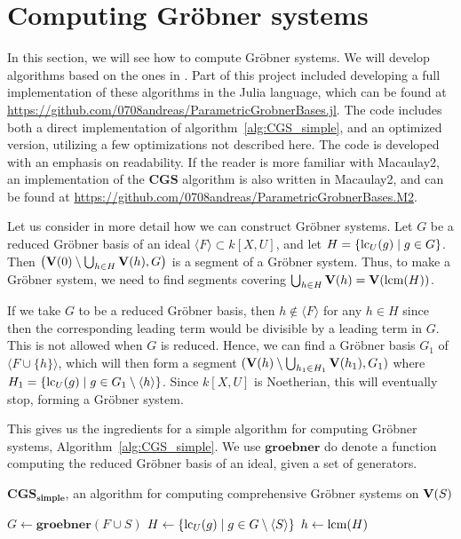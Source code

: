 \section{Computing Gröbner systems}
In this section, we will see how to compute Gröbner systems. We will develop algorithms based on the ones in \cite{ss_algo}. Part of this project included developing a full implementation of these algorithms in the Julia language, which can be found at \url{https://github.com/0708andreas/ParametricGrobnerBases.jl}. The code includes both a direct implementation of algorithm~\ref{alg:CGS_simple}, and an optimized version, utilizing a few optimizations not described here. The code is developed with an emphasis on readability. If the reader is more familiar with Macaulay2, an implementation of the $\mathbf{CGS}$ algorithm is also written in Macaulay2, and can be found at \url{https://github.com/0708andreas/ParametricGrobnerBases.M2}.

Let us consider in more detail how we can construct Gröbner systems. Let $G$ be a reduced Gröbner basis of an ideal $\langle F \rangle \subset k[X, U]$, and let $H = \{\operatorname{lc}_{U}(g) \mid g \in G\}$. Then $\left(\operatorname{\mathbf V}(0) \setminus \bigcup_{h \in H} \operatorname{\mathbf V}(h), G\right)$ is a segment of a Gröbner system. Thus, to make a Gröbner system, we need to find segments covering $\bigcup_{h \in H} \operatorname{\mathbf V}(h) = \operatorname{\mathbf V}(\operatorname{lcm}(H))$.

If we take $G$ to be a reduced Gröbner basis, then $h \notin \langle F \rangle$ for any $h \in H$ since then the corresponding leading term would be divisible by a leading term in $G$. This is not allowed when $G$ is reduced. Hence, we can find a Gröbner basis $G_{1}$ of $\langle F \cup \{h\} \rangle$, which will then form a segment $(\operatorname{\mathbf V}(h) \setminus \bigcup_{h_{1} \in H_{1}} \operatorname{\mathbf V}(h_{1}), G_{1})$ where $H_{1} = \{\operatorname{lc}_{U}(g) \mid g \in G_{1} \setminus \langle h \rangle\}$. Since $k[X, U]$ is Noetherian, this will eventually stop, forming a Gröbner system.

This gives us the ingredients for a simple algorithm for computing Gröbner systems, Algorithm~\ref{alg:CGS_simple}. We use $\mathbf{groebner}$ do denote a function computing the reduced Gröbner basis of an ideal, given a set of generators.

\begin{algorithm}
  \caption{$\mathbf{CGS_{simple}}$, an algorithm for computing comprehensive Gröbner systems on $\operatorname{\mathbf V}(S)$}%
  \label{alg:CGS_simple}
    {
    \KwRet{\emptyset}\;
  } {
    $G \gets \mathbf{groebner}(F \cup S)$\;
    $H \gets \{\operatorname{lc}_{U}(g) \mid g \in G \setminus \langle S \rangle\}$\;
    $h \gets \operatorname{lcm}(H)$\;
  }
\end{algorithm}

